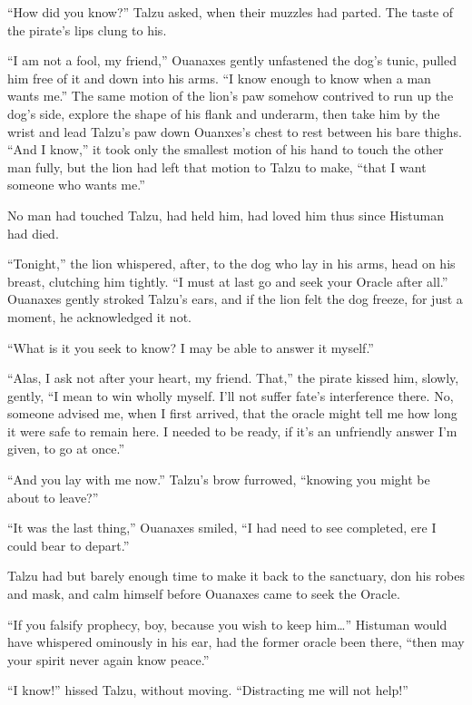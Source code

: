 ``How did you know?'' Talzu asked, when their muzzles had parted. The taste of the pirate's lips clung to his.

``I am not a fool, my friend,'' Ouanaxes gently unfastened the dog's tunic, pulled him free of it and down into his arms. ``I know enough to know when a man wants me.'' The same motion of the lion's paw somehow contrived to run up the dog's side, explore the shape of his flank and underarm, then take him by the wrist and lead Talzu's paw down Ouanxes's chest to rest between his bare thighs. ``And I know,'' it took only the smallest motion of his hand to touch the other man fully, but the lion had left that motion to Talzu to make, ``that I want someone who wants me.''

No man had touched Talzu, had held him, had loved him thus since Histuman had died.

``Tonight,'' the lion whispered, after, to the dog who lay in his arms, head on his breast, clutching him tightly. ``I must at last go and seek your Oracle after all.'' Ouanaxes gently stroked Talzu's ears, and if the lion felt the dog freeze, for just a moment, he acknowledged it not.

``What is it you seek to know? I may be able to answer it myself.''

``Alas, I ask not after your heart, my friend. That,'' the pirate kissed him, slowly, gently, ``I mean to win wholly myself. I'll not suffer fate's interference there. No, someone advised me, when I first arrived, that the oracle might tell me how long it were safe to remain here. I needed to be ready, if it's an unfriendly answer I'm given, to go at once.''

``And you lay with me now.'' Talzu's brow furrowed, ``knowing you might be about to leave?''

``It was the last thing,'' Ouanaxes smiled, ``I had need to see completed, ere I could bear to depart.''

\secdiv

Talzu had but barely enough time to make it back to the sanctuary, don his robes and mask, and calm himself before Ouanaxes came to seek the Oracle.

``If you falsify prophecy, boy, because you wish to keep him\ldots'' Histuman would have whispered ominously in his ear, had the former oracle been there, ``then may your spirit never again know peace.''

``I know!'' hissed Talzu, without moving. ``Distracting me will not help!''

